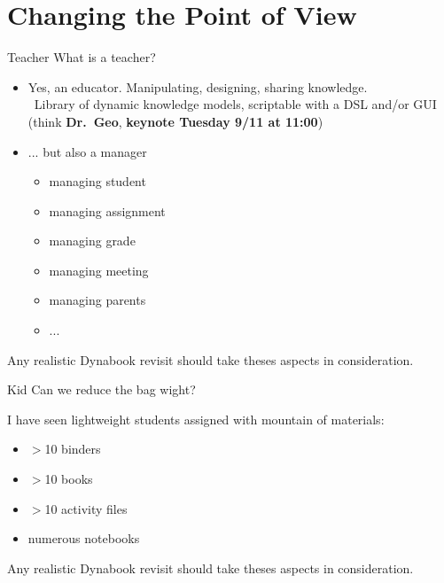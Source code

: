 \documentclass{beamer}
\newcommand{\tip}{\boldmath{\textcolor{red}{$\Rightarrow$}}}
\newcommand{\drgeo}{Dr.~Geo}
\begin{document}
\section{Changing the Point of View}
\begin{frame}{Teacher}
  What is a teacher?
  \vspace*{10pt}
  \begin{itemize}
  \item Yes, an educator. Manipulating, designing, sharing knowledge.\\
    \tip\ Library of dynamic knowledge models, scriptable with a DSL
    and/or GUI (think \textbf{\drgeo}, \textbf{keynote Tuesday 9/11 at 11:00})

  \item ... but also a manager
    \begin{itemize}
    \item managing student
    \item managing assignment
    \item managing grade
    \item managing meeting
    \item managing parents
    \item ...
    \end{itemize}
  \end{itemize}
  \vspace*{10pt}

  Any realistic Dynabook revisit should take theses aspects in
  consideration.
\end{frame}
%
\begin{frame}{Kid}
  Can we reduce the bag wight?

  \vspace*{10pt}

  I have seen lightweight students assigned with mountain of materials:
  \begin{itemize}
  \item $>$10 binders
  \item $>$10 books
  \item $>$10 activity files
  \item numerous notebooks
  \end{itemize}

  \vspace*{10pt}
  
  Any realistic Dynabook revisit should take theses aspects in
  consideration.

\end{frame}
%
\end{document}

